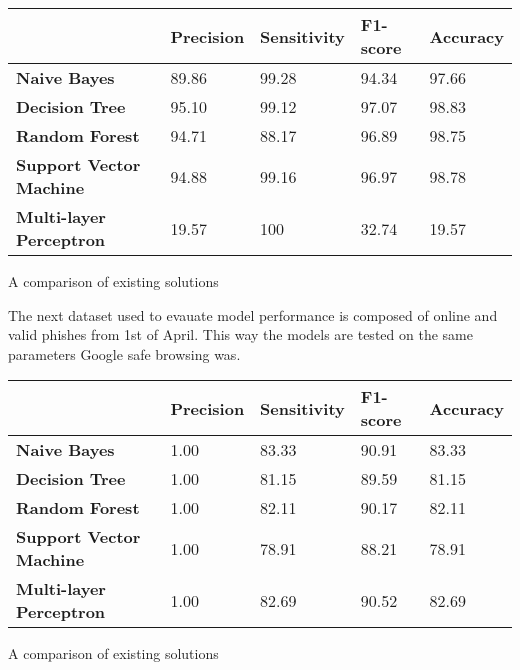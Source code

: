 \begin{singlespace}
	\small
	\begin{center}
		\label{tab:FIRST_TRAINED_MODELS}
		\begin{tabular}{ | m{8em} | m{13em} | m{8.5em} | m{2.3em} | m{5em} | }
			\hline
			                                & \textbf{Precision} &\textbf{Sensitivity} &\textbf{F1-score}& \textbf{Accuracy}  \\
			\hline
			\textbf{Naive Bayes}            & 89.86  & 99.28 & 94.34 &97.66        \\
			\hline
			\textbf{Decision Tree}          & 95.10 & 99.12 & 97.07 & 98.83        \\
			\hline
			\textbf{Random Forest}          & 94.71 & 88.17 & 96.89 & 98.75      \\
			\hline
			\textbf{Support Vector Machine} & 94.88 &99.16&96.97&98.78 \\
			\hline
			\textbf{Multi-layer Perceptron} & 19.57 & 100 & 32.74 & 19.57   \\
			\hline
		\end{tabular}
		\captionsetup{type=table}\caption{A comparison of existing solutions \citep{INTELLIGENT_PHISHING_ANFIS}}
	\end{center}
\end{singlespace}


The next dataset used to evauate model performance is composed of online and valid phishes from 1st of April. This way the models are tested on the same parameters Google safe browsing was.

\begin{singlespace}
	\small
	\begin{center}
		\label{tab:FIRST_TRAINED_MODELS}
		\begin{tabular}{ | m{8em} | m{13em} | m{8.5em} | m{2.3em} | m{5em} | }
			\hline
			                                & \textbf{Precision} &\textbf{Sensitivity} &\textbf{F1-score}& \textbf{Accuracy}  \\
			\hline
			\textbf{Naive Bayes}            & 1.00  & 83.33 & 90.91 &83.33        \\
			\hline
			\textbf{Decision Tree}          & 1.00 & 81.15 & 89.59 & 81.15        \\
			\hline
			\textbf{Random Forest}          & 1.00 & 82.11 & 90.17 & 82.11      \\
			\hline
			\textbf{Support Vector Machine} & 1.00 &78.91&88.21&78.91 \\
			\hline
			\textbf{Multi-layer Perceptron} & 1.00 & 82.69 & 90.52 & 82.69   \\
			\hline
		\end{tabular}
		\captionsetup{type=table}\caption{A comparison of existing solutions \citep{INTELLIGENT_PHISHING_ANFIS}}
	\end{center}
\end{singlespace}


